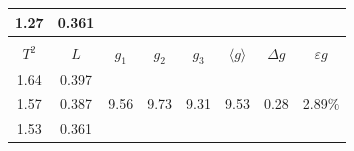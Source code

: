 \documentclass[a4paper,12pt]{article}
\begin{document}
\begin{table}[htp]
\begin{tabular}{|cccccccc|}
\multicolumn{1}{|c|}{1.27}  & \multicolumn{1}{c|}{0.361} & \multicolumn{1}{c|}{}                      & \multicolumn{1}{c|}{}                       & \multicolumn{1}{c|}{}                       & \multicolumn{1}{c|}{}                       & \multicolumn{1}{c|}{}                      &                           \\ \hline
                            &                            &                                            &                                             &                                             &                                             &                                            &                           \\ \hline
\multicolumn{1}{|c|}{$T^2$} & \multicolumn{1}{c|}{$L$}   & \multicolumn{1}{c|}{$g_1$}                 & \multicolumn{1}{c|}{$g_2$}                  & \multicolumn{1}{c|}{$g_3$}                  & \multicolumn{1}{c|}{$\langle g\rangle$}     & \multicolumn{1}{c|}{$\Delta g$}            & $\varepsilon g$           \\ \hline
\multicolumn{1}{|c|}{1.64}  & \multicolumn{1}{c|}{0.397} & \multicolumn{1}{c|}{\multirow{3}{*}{9.56}} & \multicolumn{1}{c|}{\multirow{3}{*}{9.73}}  & \multicolumn{1}{c|}{\multirow{3}{*}{9.31}}  & \multicolumn{1}{c|}{\multirow{3}{*}{9.53}}  & \multicolumn{1}{c|}{\multirow{3}{*}{0.28}} & \multirow{3}{*}{2.89$\%$} \\ \cline{1-2}
\multicolumn{1}{|c|}{1.57}  & \multicolumn{1}{c|}{0.387} & \multicolumn{1}{c|}{}                      & \multicolumn{1}{c|}{}                       & \multicolumn{1}{c|}{}                       & \multicolumn{1}{c|}{}                       & \multicolumn{1}{c|}{}                      &                           \\ \cline{1-2}
\multicolumn{1}{|c|}{1.53}  & \multicolumn{1}{c|}{0.361} & \multicolumn{1}{c|}{}                      & \multicolumn{1}{c|}{}                       & \multicolumn{1}{c|}{}                       & \multicolumn{1}{c|}{}                       & \multicolumn{1}{c|}{}                      &                           \\ \hline
\end{tabular}
\end{table}\newpage
\end{document}
